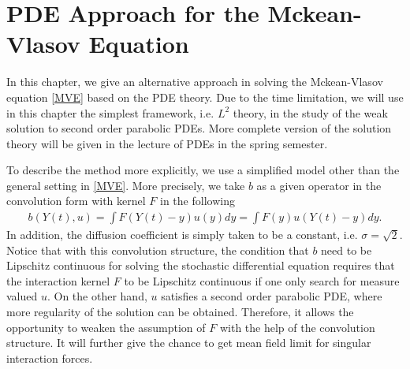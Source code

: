 \chapter{PDE Approach for the Mckean-Vlasov Equation}

In this chapter, we give an alternative approach in solving the Mckean-Vlasov equation \autoref{MVE} based on the PDE theory. Due to the time limitation, we will use in this chapter the simplest framework, i.e. $L^2$ theory, in the study of the weak solution to second order parabolic PDEs. More complete version of the solution theory will be given in the lecture of PDEs in the spring semester.

To describe the method more explicitly, we use a simplified model other than the general setting in \autoref{MVE}. More precisely, we take $b$ as a given operator in the convolution form with kernel $F$ in the following
\begin{align*}
	b(Y(t),u) = \int F(Y(t)-y)u(y) dy = \int F(y)u(Y(t)-y) dy
.\end{align*}
In addition, the diffusion coefficient is simply taken to be a constant, i.e. $\sigma=\sqrt{2}$. Notice that with this convolution structure, the condition that $b$ need to be Lipschitz continuous for solving the stochastic differential equation requires that the interaction kernel $F$ to be Lipschitz continuous if one only search for measure valued $u$. On the other hand, $u$ satisfies a second order parabolic PDE, where more regularity of the solution can be obtained. Therefore, it allows the opportunity to weaken the assumption of $F$ with the help of the convolution structure. It will further give the chance to get mean field limit for singular interaction forces.

